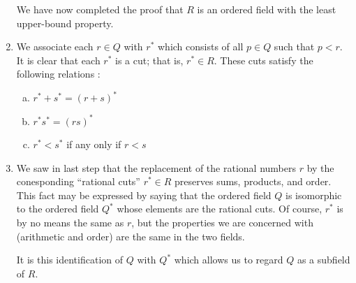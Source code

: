 \begin{enumerate}[{\bf Step 1.}]
We have now completed the proof that $R$ is an ordered field with the least upper-bound property.

\item We associate each $r \in Q$ with $r^*$ which consists of all $p \in Q$
such that $p < r$. It is clear that each $r^*$ is a cut; that is, $r^* \in R$.
These cuts satisfy the following relations :

\begin{enumerate}[(a)]
	\item $r^* + s^* = (r+s)^*$
	\item $r^* s^* = (rs)^*$
	\item $r^* < s^*$ if any only if $r < s$
\end{enumerate}

\item We saw in last step that the replacement of the rational numbers $r$ by the conesponding ``rational cuts'' $r^* \in R$ preserves sums, products, and order.
This fact may be expressed by saying that the ordered field $Q$ is isomorphic to the ordered field $Q^*$ whose elements are the rational cuts.
Of course, $r^*$ is by no means the same as $r$, but the properties we are concerned with (arithmetic and order) are the same in the two fields.

It is this identification of $Q$ with $Q^*$ which allows us to regard $Q$ as a subfield of $R$.

\end{enumerate}


